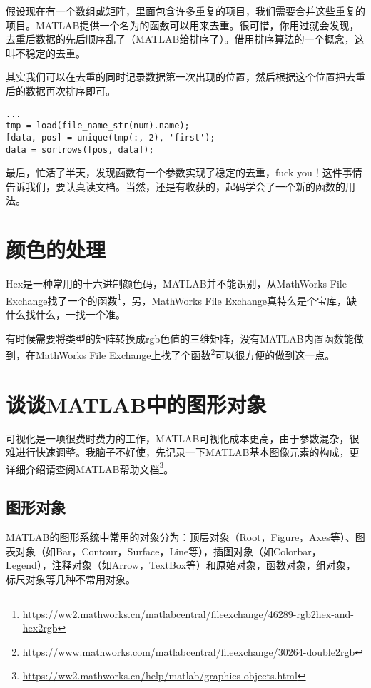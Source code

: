 假设现在有一个数组或矩阵，里面包含许多重复的项目，我们需要合并这些重复的项目。MATLAB提供一个名为的函数可以用来去重。很可惜，你用过就会发现，去重后数据的先后顺序乱了（MATLAB给排序了）。借用排序算法的一个概念，这叫不稳定的去重。

其实我们可以在去重的同时记录数据第一次出现的位置，然后根据这个位置把去重后的数据再次排序即可。

\begin{verbatim}
...
tmp = load(file_name_str(num).name);
[data, pos] = unique(tmp(:, 2), 'first');
data = sortrows([pos, data]);
\end{verbatim}

最后，忙活了半天，发现函数有一个参数实现了稳定的去重，fuck you！这件事情告诉我们，要认真读文档。当然，还是有收获的，起码学会了一个新的函数的用法。


\section{颜色的处理}

Hex是一种常用的十六进制颜色码，MATLAB并不能识别，从MathWorks File Exchange找了一个的函数\footnote{\url{https://ww2.mathworks.cn/matlabcentral/fileexchange/46289-rgb2hex-and-hex2rgb}}，另，MathWorks File Exchange真特么是个宝库，缺什么找什么，一找一个准。

有时候需要将类型的矩阵转换成rgb色值的三维矩阵，没有MATLAB内置函数能做到，在MathWorks File Exchange上找了个函数\footnote{\url{https://www.mathworks.com/matlabcentral/fileexchange/30264-double2rgb}}可以很方便的做到这一点。

\section{谈谈MATLAB中的图形对象}

可视化是一项很费时费力的工作，MATLAB可视化成本更高，由于参数混杂，很难进行快速调整。我脑子不好使，先记录一下MATLAB基本图像元素的构成，更详细介绍请查阅MATLAB帮助文档\footnote{\url{https://ww2.mathworks.cn/help/matlab/graphics-objects.html}}。

\subsection{图形对象}

MATLAB的图形系统中常用的对象分为：顶层对象（Root，Figure，Axes等）、图表对象（如Bar，Contour，Surface，Line等），插图对象（如Colorbar，Legend），注释对象（如Arrow，TextBox等）和原始对象，函数对象，组对象，标尺对象等几种不常用对象。

